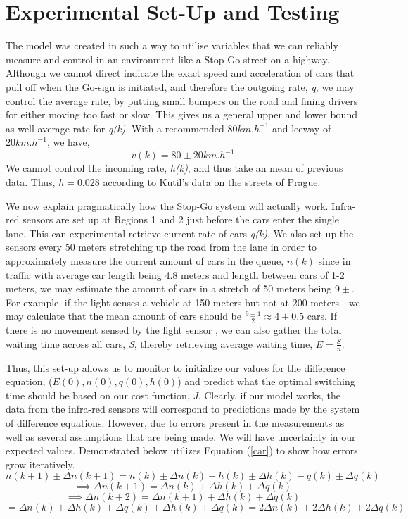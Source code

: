 \documentclass[a4paper]{article}
\begin{document}
\section{Experimental Set-Up and Testing}

The model was created in such a way to utilise variables that we can reliably measure and control in an environment like a Stop-Go street on a highway. Although we cannot direct indicate the exact speed and acceleration of cars that pull off when the Go-sign is initiated, and therefore the outgoing rate, \textit{q}, we may control the average rate, by putting small bumpers on the road and fining drivers for either moving too fast or slow. This gives us a general upper and lower bound as well average rate for \textit{q(k)}. With a recommended $80 km.h^{-1}$ and leeway of $20 km.h^{-1}$, we have,
\[v(k) = 80\pm 20 km.h^{-1}\]
We cannot control the incoming rate, \textit{h(k)}, and thus take an mean of previous data. Thus, $h = 0.028 $ according to Kutil's data on the streets of Prague.

We now explain pragmatically how the Stop-Go system will actually work. Infra-red sensors are set up at Regions 1 and 2 just before the cars enter the single lane. This can experimental retrieve current rate of cars \textit{q(k)}. We also set up the sensors every 50 meters stretching up the road from the lane in order to approximately measure the current amount of cars in the queue, $n(k)$ since in traffic with average car length being 4.8 meters and length between cars of 1-2 meters, we may estimate the amount of cars in a stretch of 50 meters being $9\pm$. For example, if the light senses a vehicle at 150 meters but not at 200 meters - we may calculate that the mean amount of cars should be $\frac{9\pm 1}{2} \approx 4 \pm 0.5$ cars. If there is no movement sensed by the light sensor , we can also gather the total waiting time across all cars, \textit{S}, thereby retrieving average waiting time, $E = \frac{S}{n}$. 

Thus, this set-up allows us to monitor to initialize our values for the difference equation, ($E(0), n(0), q(0), h(0)$) and predict what the optimal switching time should be based on our cost function, \textit{J}. Clearly, if our model works, the data from the infra-red sensors will correspond to predictions made by the system of difference equations. However, due to errors present in the measurements as well as several assumptions that are being made. We will have uncertainty in our expected values. Demonstrated below utilizes Equation (\ref{car}) to show how errors grow iteratively.
\[n(k+1) \pm \Delta n(k+1)= n(k)\pm \Delta n(k) +h (k)\pm\Delta h(k) -q(k)\pm\Delta q(k)\]
\[\implies \Delta n(k+1) = \Delta n(k) + \Delta h(k)+ \Delta q(k)\]
\[\implies \Delta n(k+2) = \Delta n(k+1) + \Delta h(k)+ \Delta q(k) \]
\[= \Delta n(k) + \Delta h(k)+ \Delta q(k) + \Delta h(k)+ \Delta q(k) = 2\Delta n(k) + 2\Delta h(k)+ 2\Delta q(k)\]
\end{document}
